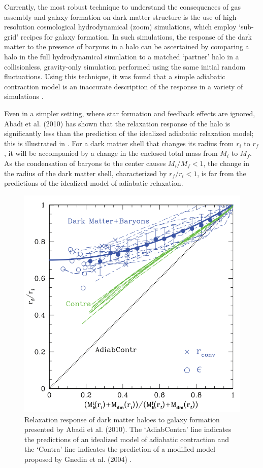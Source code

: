 Currently, the most robust technique to understand the consequences of gas assembly and galaxy formation on dark matter structure is the use of high-resolution cosmological hydrodynamical (zoom) simulations, which employ `sub-grid' recipes for galaxy formation. In such simulations, the response of the dark matter to the presence of baryons in a halo can be ascertained by comparing a halo in the full hydrodynamical simulation to a matched `partner' halo in a collisionless, gravity-only simulation performed using the same initial random fluctuations. Using this technique, it was found that a simple adiabatic contraction model \citep[][]{1986ApJ...301...27B} is an inaccurate description of the response in a variety of simulations \citep[see, e.g.,][]{2004ApJ...616...16G,2006PhRvD..74l3522G,2010MNRAS.402..776P,2010MNRAS.406..922T,2010MNRAS.405.2161D,2010MNRAS.407..435A,2011MNRAS.414..195T,2016MNRAS.461.2658D,2019A&A...622A.197A,2022MNRAS.511.3910F}.

Even in a simpler setting, where star formation and feedback effects are ignored, Abadi et al. (2010) \citep{2010MNRAS.407..435A} has shown that the relaxation response of the halo is significantly less than the prediction of the idealized adiabatic relaxation model; this is illustrated in . For a dark matter shell that changes its radius from $r_i$ to $r_f$, it will be accompanied by a change in the enclosed total mass from $M_i$ to $M_f$. As the condensation of baryons to the center causes $M_i/M_f < 1$, the change in the radius of the dark matter shell, characterized by $r_f/r_i < 1$, is far from the predictions of the idealized model of adiabatic relaxation.

\begin{figure}
\centering
\includegraphics[width=0.7\linewidth]{Figures/Abadi_relxation.png}
\caption{Relaxation response of dark matter haloes to galaxy formation presented by Abadi et al. (2010). The `AdiabContra' line indicates the predictions of an idealized model of adiabatic contraction \citep[][]{1986ApJ...301...27B} and the `Contra' line indicates the prediction of a modified model proposed by Gnedin et al. (2004) \citep{2004ApJ...616...16G}.}
\label{fig:illustrate_abadi}
\end{figure}

